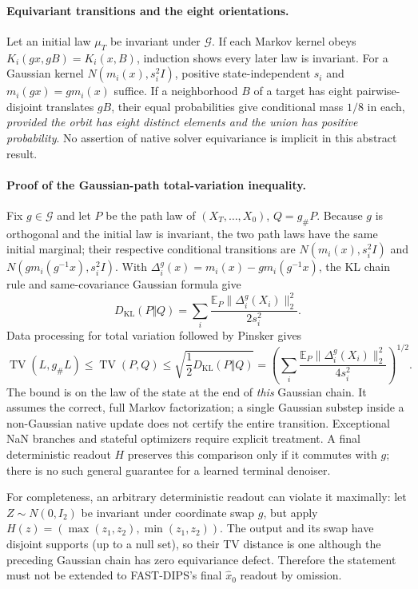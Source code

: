 \paragraph{Equivariant transitions and the eight orientations.}
Let an initial law $\mu_T$ be invariant under $\mathcal G$.
If each Markov kernel obeys
$K_i(gx,gB)=K_i(x,B)$, induction shows every later law is invariant.
For a Gaussian kernel $N(m_i(x),s_i^2 I)$, positive
state-independent $s_i$ and $m_i(gx)=g m_i(x)$ suffice. If a
neighborhood $B$ of a target has eight pairwise-disjoint translates
$gB$, their equal probabilities give conditional mass $1/8$ in each,
\emph{provided the orbit has eight distinct elements and the union
has positive probability}. No assertion of native solver equivariance
is implicit in this abstract result.

\paragraph{Proof of the Gaussian-path total-variation inequality.}
Fix $g\in\mathcal G$ and let $P$ be the path law of
$(X_T,\ldots,X_0)$, $Q=g_\#P$. Because $g$ is orthogonal and the
initial law is invariant, the two path laws have the same initial
marginal; their respective conditional transitions are
$N(m_i(x),s_i^2 I)$ and $N(gm_i(g^{-1}x),s_i^2 I)$.
With $\Delta_i^g(x)=m_i(x)-gm_i(g^{-1}x)$, the KL chain rule and
same-covariance Gaussian formula give
\[
 D_{\mathrm{KL}}(P\Vert Q)
 =\sum_i\frac{\mathbb E_P\|\Delta_i^g(X_i)\|_2^2}{2s_i^2}.
\]
Data processing for total variation followed by Pinsker gives
\[
 \operatorname{TV}(L,g_\#L)
 \le\operatorname{TV}(P,Q)
 \le\sqrt{\frac{1}{2}D_{\mathrm{KL}}(P\Vert Q)}
 =\left(\sum_i\frac{\mathbb E_P\|\Delta_i^g(X_i)\|_2^2}
 {4s_i^2}\right)^{1/2}.
\]
The bound is on the law of the state at the end of \emph{this}
Gaussian chain. It assumes the correct, full Markov factorization;
a single Gaussian substep inside a non-Gaussian native update does
not certify the entire transition. Exceptional NaN branches and
stateful optimizers require explicit treatment. A final deterministic
readout $H$ preserves this comparison only if it commutes with $g$;
there is no such general guarantee for a learned terminal denoiser.

For completeness, an arbitrary deterministic readout can violate
it maximally: let $Z\sim N(0,I_2)$ be invariant under coordinate
swap $g$, but apply
$H(z)=(\max(z_1,z_2),\min(z_1,z_2))$.
The output and its swap have disjoint supports (up to a null set),
so their TV distance is one although the preceding Gaussian chain
has zero equivariance defect. Therefore the statement must not be
extended to FAST-DIPS's final $\widehat x_0$ readout by omission.

